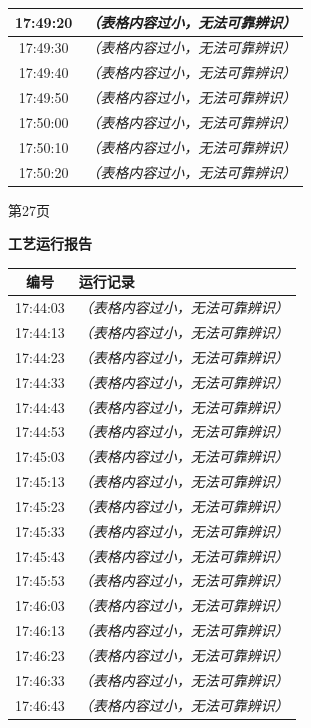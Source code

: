\documentclass[UTF8,10pt,a4paper,fontset=fandol]{ctexart}
\begin{document}
\begin{center}
\begin{minipage}[t]{0.47\textwidth}
\begin{tabularx}{\linewidth}{|c|X|}
17:49:20 & \textit{（表格内容过小，无法可靠辨识）} \\ \hline
17:49:30 & \textit{（表格内容过小，无法可靠辨识）} \\ \hline
17:49:40 & \textit{（表格内容过小，无法可靠辨识）} \\ \hline
17:49:50 & \textit{（表格内容过小，无法可靠辨识）} \\ \hline
17:50:00 & \textit{（表格内容过小，无法可靠辨识）} \\ \hline
17:50:10 & \textit{（表格内容过小，无法可靠辨识）} \\ \hline
17:50:20 & \textit{（表格内容过小，无法可靠辨识）} \\ \hline
\end{tabularx}

\vspace{3pt}
第27页
\end{minipage}
\hfill
\begin{minipage}[t]{0.47\textwidth}
\centering
\textbf{工艺运行报告}

\vspace{2pt}
\begin{tabularx}{\linewidth}{|c|X|}
\hline
编号 & 运行记录 \\ \hline
17:44:03 & \textit{（表格内容过小，无法可靠辨识）} \\ \hline
17:44:13 & \textit{（表格内容过小，无法可靠辨识）} \\ \hline
17:44:23 & \textit{（表格内容过小，无法可靠辨识）} \\ \hline
17:44:33 & \textit{（表格内容过小，无法可靠辨识）} \\ \hline
17:44:43 & \textit{（表格内容过小，无法可靠辨识）} \\ \hline
17:44:53 & \textit{（表格内容过小，无法可靠辨识）} \\ \hline
17:45:03 & \textit{（表格内容过小，无法可靠辨识）} \\ \hline
17:45:13 & \textit{（表格内容过小，无法可靠辨识）} \\ \hline
17:45:23 & \textit{（表格内容过小，无法可靠辨识）} \\ \hline
17:45:33 & \textit{（表格内容过小，无法可靠辨识）} \\ \hline
17:45:43 & \textit{（表格内容过小，无法可靠辨识）} \\ \hline
17:45:53 & \textit{（表格内容过小，无法可靠辨识）} \\ \hline
17:46:03 & \textit{（表格内容过小，无法可靠辨识）} \\ \hline
17:46:13 & \textit{（表格内容过小，无法可靠辨识）} \\ \hline
17:46:23 & \textit{（表格内容过小，无法可靠辨识）} \\ \hline
17:46:33 & \textit{（表格内容过小，无法可靠辨识）} \\ \hline
17:46:43 & \textit{（表格内容过小，无法可靠辨识）} \\ \hline
\end{tabularx}


\end{minipage}
\end{center}
\end{document}
